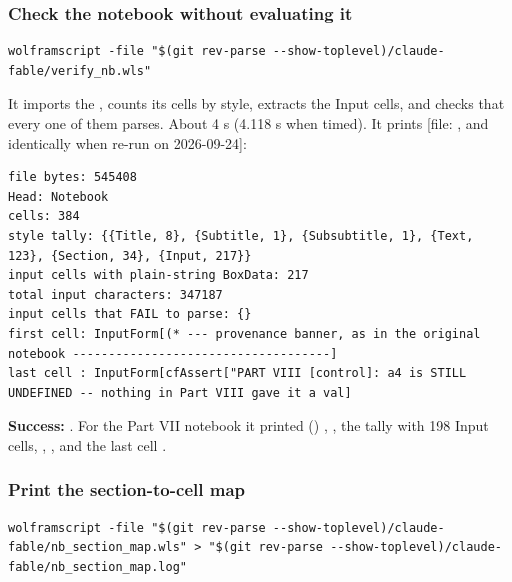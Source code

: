 \subsubsection{Check the notebook without evaluating it}
\label{sec:6.3.2}

\begin{Verbatim}
wolframscript -file "$(git rev-parse --show-toplevel)/claude-fable/verify_nb.wls"
\end{Verbatim}

It imports the , counts its cells by style, extracts the Input cells, and checks that every one of them parses. About 4 s (4.118 s when timed). It prints [file: , and identically when re-run on 2026-09-24]:

\begin{Verbatim}
file bytes: 545408
Head: Notebook
cells: 384
style tally: {{Title, 8}, {Subtitle, 1}, {Subsubtitle, 1}, {Text, 123}, {Section, 34}, {Input, 217}}
input cells with plain-string BoxData: 217
total input characters: 347187
input cells that FAIL to parse: {}
first cell: InputForm[(* --- provenance banner, as in the original notebook ------------------------------------]
last cell : InputForm[cfAssert["PART VIII [control]: a4 is STILL UNDEFINED -- nothing in Part VIII gave it a val]
\end{Verbatim}

\textbf{Success:} . For the Part VII notebook it printed () , , the tally with 198 Input cells, , , and the last cell .

\subsubsection{Print the section-to-cell map}
\label{sec:6.3.3}

\begin{Verbatim}
wolframscript -file "$(git rev-parse --show-toplevel)/claude-fable/nb_section_map.wls" > "$(git rev-parse --show-toplevel)/claude-fable/nb_section_map.log"
\end{Verbatim}


